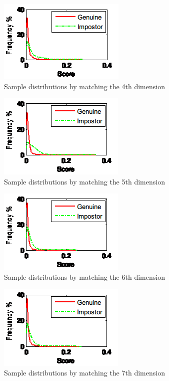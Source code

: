 \begin{figure}[htb]
  \begin{center}
    \includegraphics[scale=1]{ch-experiment/figures/11d}
    \caption{Sample distributions by matching the 4th dimension}
    \label{fig:experiment:11d}
  \end{center}
\end{figure}

\begin{figure}[htb]
  \begin{center}
    \includegraphics[scale=1]{ch-experiment/figures/11e}
    \caption{Sample distributions by matching the 5th dimension}
    \label{fig:experiment:11e}
  \end{center}
\end{figure}

\begin{figure}[htb]
  \begin{center}
    \includegraphics[scale=1]{ch-experiment/figures/11f}
    \caption{Sample distributions by matching the 6th dimension}
    \label{fig:experiment:11f}
  \end{center}
\end{figure}

\begin{figure}[htb]
  \begin{center}
    \includegraphics[scale=1]{ch-experiment/figures/11g}
    \caption{Sample distributions by matching the 7th dimension}
    \label{fig:experiment:11g}
  \end{center}
\end{figure}

